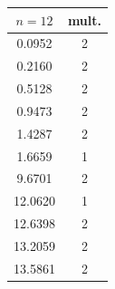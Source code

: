 \begin{table}
\begin{minipage}{.2\textwidth}
\begin{tabular}{|c|c|}
\hline
$n = 12$ & mult.\\ \hline
0.0952& 2\\
0.2160& 2\\
0.5128& 2\\
0.9473& 2\\
1.4287& 2\\
1.6659& 1\\
9.6701& 2\\
12.0620& 1\\
12.6398& 2\\
13.2059& 2\\
13.5861& 2\\
\hline
\end{tabular}
\end{minipage}


\end{table}

